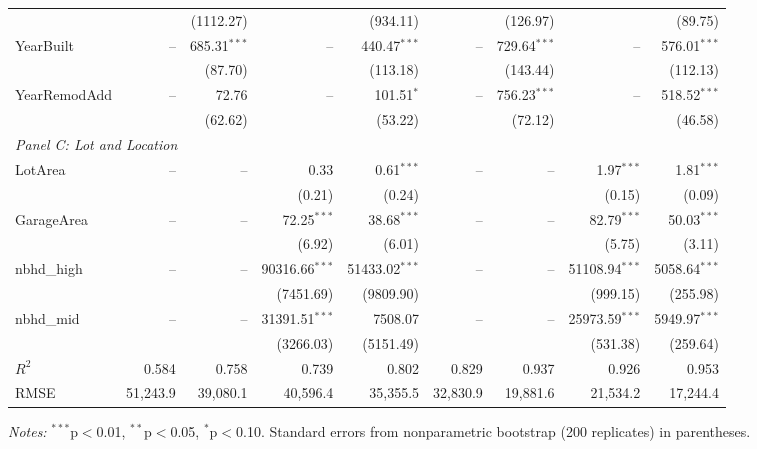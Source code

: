 \documentclass[12pt]{article}
\begin{document}
\begin{table}[htbp]
{\begin{threeparttable}
\begin{tabular}{lrrrrrrrr}
					&  & (1112.27) &  & (934.11) &  & (126.97) &  & (89.75) \\
					\quad YearBuilt & -- & 685.31$^{***}$ & -- & 440.47$^{***}$ & -- & 729.64$^{***}$ & -- & 576.01$^{***}$ \\
					&  & (87.70) &  & (113.18) &  & (143.44) &  & (112.13) \\
					\quad YearRemodAdd & -- & 72.76 & -- & 101.51$^{*}$ & -- & 756.23$^{***}$ & -- & 518.52$^{***}$ \\
					&  & (62.62) &  & (53.22) &  & (72.12) &  & (46.58) \\
					\midrule
					\multicolumn{9}{l}{\textit{Panel C: Lot and Location}} \\
					\quad LotArea & -- & -- & 0.33 & 0.61$^{***}$ & -- & -- & 1.97$^{***}$ & 1.81$^{***}$ \\
					&  &  & (0.21) & (0.24) &  &  & (0.15) & (0.09) \\
					\quad GarageArea & -- & -- & 72.25$^{***}$ & 38.68$^{***}$ & -- & -- & 82.79$^{***}$ & 50.03$^{***}$ \\
					&  &  & (6.92) & (6.01) &  &  & (5.75) & (3.11) \\
					\quad nbhd\_high & -- & -- & 90316.66$^{***}$ & 51433.02$^{***}$ & -- & -- & 51108.94$^{***}$ & 5058.64$^{***}$ \\
					&  &  & (7451.69) & (9809.90) &  &  & (999.15) & (255.98) \\
					\quad nbhd\_mid & -- & -- & 31391.51$^{***}$ & 7508.07 & -- & -- & 25973.59$^{***}$ & 5949.97$^{***}$ \\
					&  &  & (3266.03) & (5151.49) &  &  & (531.38) & (259.64) \\
					\midrule
					$R^2$ & 0.584 & 0.758 & 0.739 & 0.802 & 0.829 & 0.937 & 0.926 & 0.953 \\
					RMSE & 51,243.9 & 39,080.1 & 40,596.4 & 35,355.5 & 32,830.9 & 19,881.6 & 21,534.2 & 17,244.4 \\
					\bottomrule
				\end{tabular}
				\begin{tablenotes}
					\footnotesize
					\item \textit{Notes:} $^{***}$p$<$0.01, $^{**}$p$<$0.05, $^{*}$p$<$0.10. Standard errors from nonparametric bootstrap (200 replicates) in parentheses.
				\end{tablenotes}
			\end{threeparttable}
		}%
	\end{table}
	
\end{document}
